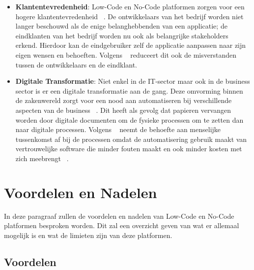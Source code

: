 \begin{itemize}
    \item \textbf{Klantentevredenheid}:
    Low-Code en No-Code platformen zorgen voor een hogere klantentevredenheid ~\autocite{Elshan2023}. 
    De ontwikkelaars van het bedrijf worden niet langer beschouwd als de enige belanghebbenden van een applicatie; de eindklanten van het bedrijf worden nu ook als belangrijke stakeholders erkend.
    Hierdoor kan de eindgebruiker zelf de applicatie aanpassen naar zijn eigen wensen en behoeften. 
    Volgens ~\textcite{Elshan2023} reduceert dit ook de misverstanden tussen de ontwikkelaars en de eindklant.

    \item \textbf{Digitale Transformatie}: 
    Niet enkel in de IT-sector maar ook in de business sector is er een digitale transformatie aan de gang. 
    Deze omvorming binnen de zakenwereld zorgt voor een nood aan automatiseren bij verschillende aspecten van de business ~\autocite{ALSAADI_2021}. 
    Dit heeft als gevolg dat papieren vervangen worden door digitale documenten om de fysieke processen om te zetten dan naar digitale processen. 
    Volgens ~\textcite{ALSAADI_2021} neemt de behoefte aan menselijke tussenkomst af bij de processen omdat de automatisering gebruik maakt van vertrouwelijke software die minder fouten maakt en ook minder kosten met zich meebrengt ~\autocite{ALSAADI_2021}.
  \end{itemize} 

\section{Voordelen en Nadelen}
\label{sec:voordelen-nadelen}
In deze paragraaf zullen de voordelen en nadelen van Low-Code en No-Code platformen besproken worden. Dit zal
een overzicht geven van wat er allemaal mogelijk is en wat de limieten zijn van deze platformen.
\subsection{Voordelen}%
\label{subsec:voordelen}
